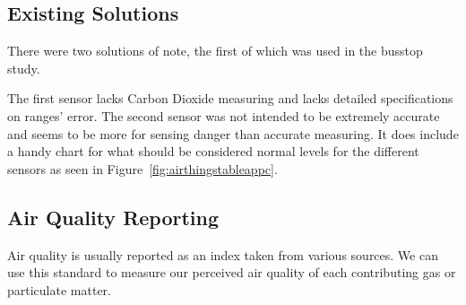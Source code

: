 \subsection{Existing Solutions}
There were two solutions of note, the first of which was used in the busstop study\cite{busstop}.
\begin{table}[!htb]
\centering
{}
\label{tab:}
\end{table}
\noindent
The first sensor lacks Carbon Dioxide measuring and lacks detailed specifications on ranges' error.
The second sensor was not intended to be extremely accurate and seems to be more for sensing danger than accurate measuring. It does include a handy chart for what should be considered normal levels for the different sensors as seen in Figure~\ref{fig:airthingstableappc}.



\pagebreak
\subsection{Air Quality Reporting}
Air quality is usually reported as an index taken from various sources. We can use this standard to measure our perceived air quality of each contributing gas or particulate matter. \cite{airqualit:index} 

